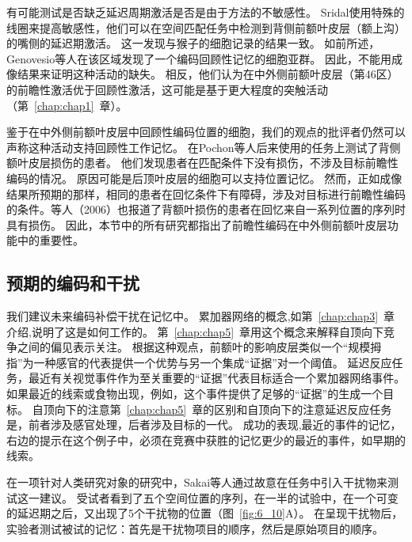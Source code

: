 有可能测试是否缺乏延迟周期激活是否是由于方法的不敏感性。
Sridal\cite{srimal2008persistent}使用特殊的线圈来提高敏感性，他们可以在空间匹配任务中检测到背侧前额叶皮层（额上沟）的嘴侧的延迟期激活。
这一发现与猴子的细胞记录的结果一致。
如前所述，Genovesio等人\cite{genovesio2006representation}在该区域发现了一个编码回顾性记忆的细胞亚群。
因此，不能用成像结果来证明这种活动的缺失。
相反，他们认为在中外侧前额叶皮层（第46区）的前瞻性激活优于回顾性激活，这可能是基于更大程度的突触活动（第~\ref{chap:chap1}~章）。



鉴于在中外侧前额叶皮层中回顾性编码位置的细胞，我们的观点的批评者仍然可以声称这种活动支持回顾性工作记忆。
在Pochon等人后来使用的任务上测试了背侧额叶皮层损伤的患者。
他们发现患者在匹配条件下没有损伤，不涉及目标前瞻性编码的情况。
原因可能是后顶叶皮层的细胞可以支持位置记忆。
然而，正如成像结果所预期的那样，相同的患者在回忆条件下有障碍，涉及对目标进行前瞻性编码的条件\cite{ferreira1998spatio}。等人（2006）也报道了背额叶损伤的患者在回忆来自一系列位置的序列时具有损伤。
因此，本节中的所有研究都指出了前瞻性编码在中外侧前额叶皮层功能中的重要性。



\subsection{预期的编码和干扰}

我们建议未来编码补偿干扰在记忆中。
累加器网络的概念,如第~\ref{chap:chap3}~章介绍,说明了这是如何工作的。
第~\ref{chap:chap5}~章用这个概念来解释自顶向下竞争之间的偏见表示关注。
根据这种观点，前额叶的影响皮层类似一个“规模拇指”为一种感官的代表提供一个优势与另一个集成“证据”对一个阈值。
延迟反应任务，最近有关视觉事件作为至关重要的“证据”代表目标适合一个累加器网络事件。
如果最近的线索或食物出现，例如，这个事件提供了足够的“证据”的生成一个目标。
自顶向下的注意第~\ref{chap:chap5}~章的区别和自顶向下的注意延迟反应任务是，前者涉及感官处理，后者涉及目标的一代。
成功的表现,最近的事件的记忆，右边的提示在这个例子中，必须在竞赛中获胜的记忆更少的最近的事件，如早期的线索。


在一项针对人类研究对象的研究中，Sakai等人\cite{sakai2002active}通过故意在任务中引入干扰物来测试这一建议。
受试者看到了五个空间位置的序列，在一半的试验中，在一个可变的延迟期之后，又出现了5个干扰物的位置（图~\ref{fig:6_10}A）。
在呈现干扰物后，实验者测试被试的记忆：首先是干扰物项目的顺序，然后是原始项目的顺序。


